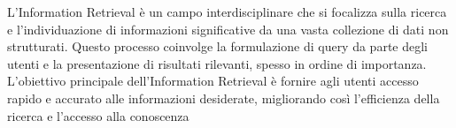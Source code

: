 L'Information Retrieval è un campo interdisciplinare che si focalizza sulla ricerca e l'individuazione di informazioni significative da una vasta collezione di dati non strutturati. Questo processo coinvolge la formulazione di query da parte degli utenti e la presentazione di risultati rilevanti, spesso in ordine di importanza. L'obiettivo principale dell'Information Retrieval è fornire agli utenti accesso rapido e accurato alle informazioni desiderate, migliorando così l'efficienza della ricerca e l'accesso alla conoscenza